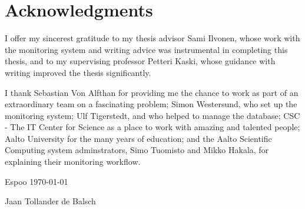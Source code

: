 \section*{Acknowledgments}
I offer my sincerest gratitude to my thesis advisor Sami Ilvonen, whose work with the monitoring system and writing advice was instrumental in completing this thesis, and to my supervising professor Petteri Kaski, whose guidance with writing improved the thesis significantly.

I thank Sebastian Von Alfthan for providing me the chance to work as part of an extraordinary team on a fascinating problem; Simon Westersund, who set up the monitoring system; Ulf Tigerstedt, and who helped to manage the database;
CSC - The IT Center for Science as a place to work with amazing and talented people; Aalto University for the many years of education; and the Aalto Scientific Computing system adminstrators, Simo Tuomisto and Mikko Hakala, for explaining their monitoring workflow.

\vspace{5cm}
Espoo \today

\vspace{5mm}
{\hfill Jaan Tollander de Balsch \hspace{1cm}}

\newpage

\setcounter{tocdepth}{2}
\tableofcontents
